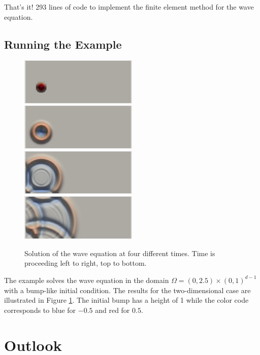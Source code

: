 \documentclass[a4paper,12pt]{article}
\begin{document}
That's it! 293 lines of code to implement the finite element method for
the wave equation.

\subsection{Running the Example}

\begin{figure}
\begin{center}
\includegraphics[width=0.499\textwidth]{wave_0}\hfill
\includegraphics[width=0.499\textwidth]{wave_1}
\includegraphics[width=0.499\textwidth]{wave_2}\hfill
\includegraphics[width=0.499\textwidth]{wave_3}
\end{center}
\caption{Solution of the wave equation at four different times. Time is proceeding left
to right, top to bottom.}
\label{fig:Bunt}
\end{figure}

The example solves the wave equation in the domain
$\Omega = (0,2.5)\times (0,1)^{d-1}$ with a bump-like
initial condition. The results for the two-dimensional case are
illustrated in Figure \ref{fig:Bunt}. The initial bump has a height of 1
while the color code corresponds to blue for $-0.5$ and red for $0.5$.

\section{Outlook}
\end{document}
